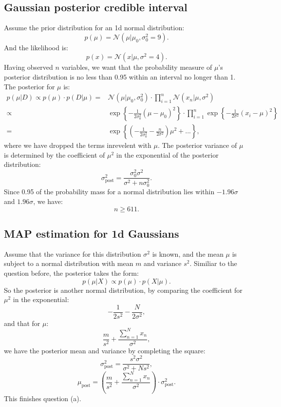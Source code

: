 \documentclass[UTF8]{ctexart}
\begin{document}
\subsection{Gaussian posterior credible interval}
Assume the prior distribution for an 1d normal distribution:
$$p(\mu) = \mathcal{N}(\mu|\mu_{0},\sigma^{2}_{0} = 9).$$
And the likelihood is:
$$p(x) = \mathcal{N}(x|\mu,\sigma^{2}=4).$$
Having observed $n$ variables, we want that the probability measure of $\mu$'s posterior distribution is no less than 0.95 within an interval no longer than 1.
The posterior for $\mu$ is:
\begin{align}
p(\mu|D) \propto p(\mu)\cdot p(D|\mu) =& \mathcal{N}(\mu|\mu_{0},\sigma^{2}_{0})\cdot \prod_{i=1}^{n}\mathcal{N}(x_{n}|\mu,\sigma^{2})\nonumber \\
\propto& \exp\left\{-\frac{1}{2\sigma^{2}_{0}}(\mu-\mu_{0})^{2}  \right\}\cdot \prod_{i=1}^{n}\exp\left\{  -\frac{1}{2\sigma^{2}}(x_{i}-\mu)^{2}\right\}\nonumber \\
=&\exp\left\{ (-\frac{1}{2\sigma_{0}^{2}}-\frac{n}{2\sigma^{2}})\mu^{2} + ... \right\},\nonumber
\end{align}
where we have dropped the terms inrevelent with $\mu$.
The posterior variance of $\mu$ is determined by the coefficient of $\mu^{2}$ in the exponential of the posterior distribution:
$$\sigma^{2}_{\text{post}}=\frac{\sigma^{2}_{0}\sigma^{2}}{\sigma^{2}+n\sigma^{2}_{0}}.$$
Since 0.95 of the probability mass for a normal distribution lies within $-1.96\sigma$ and $1.96\sigma$, we have:
$$n \geq 611.$$

\subsection{MAP estimation for 1d Gaussians}
Assume that the variance for this distribution $\sigma^{2}$ is known, and the mean $\mu$ is subject to a normal distribution with mean $m$ and variance $s^{2}$. Similiar to the question before, the posterior takes the form:
$$p(\mu|X) \propto p(\mu)\cdot p(X|\mu).$$
So the posterior is another normal distribution, by comparing the coefficient for $\mu^{2}$ in the exponential:
$$-\frac{1}{2s^{2}}-\frac{N}{2\sigma^{2}},$$
and that for $\mu$:
$$\frac{m}{s^{2}}+\frac{\sum_{n=1}^{N}x_{n}}{\sigma^{2}},$$
we have the posterior mean and variance by completing the square:
$$\sigma^{2}_{\text{post}} = \frac{s^{2}\sigma^{2}}{\sigma^{2}+Ns^{2}},$$
$$\mu_{\text{post}} = (\frac{m}{s^{2}}+\frac{\sum_{n=1}^{N}x_{n}}{\sigma^{2}})\cdot \sigma^{2}_{\text{post}}.$$
This finishes question (a).
\end{document}

